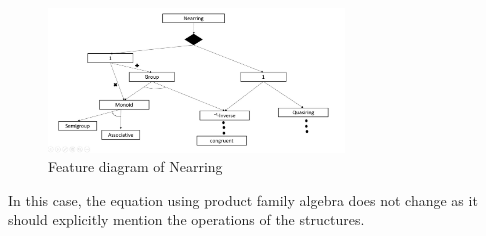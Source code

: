  \begin{figure}[ht]
	\centering
	\includegraphics[width=0.7\textwidth]{figures/Sample/nearringArrow.jpg}
	\caption{Feature diagram of Nearring}
	\label{fig_nearringArrow}
\end{figure}
In this case, the equation using product family algebra does not change as it should explicitly mention
the operations of the structures. 